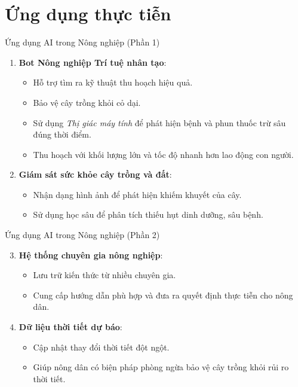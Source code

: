 \documentclass[aspectratio=169]{beamer}
\begin{document}
\section{Ứng dụng thực tiễn}
\begin{frame}{Ứng dụng AI trong Nông nghiệp (Phần 1)}
    \begin{enumerate}
        \item \textbf{Bot Nông nghiệp Trí tuệ nhân tạo}:
        \begin{itemize}
            \item Hỗ trợ tìm ra kỹ thuật thu hoạch hiệu quả.
            \item Bảo vệ cây trồng khỏi cỏ dại.
            \item Sử dụng \textit{Thị giác máy tính} để phát hiện bệnh và phun thuốc trừ sâu đúng thời điểm.
            \item Thu hoạch với khối lượng lớn và tốc độ nhanh hơn lao động con người.
        \end{itemize}
        \vspace{0.3cm}
        \item \textbf{Giám sát sức khỏe cây trồng và đất}:
        \begin{itemize}
            \item Nhận dạng hình ảnh để phát hiện khiếm khuyết của cây.
            \item Sử dụng học sâu để phân tích thiếu hụt dinh dưỡng, sâu bệnh.
        \end{itemize}
    \end{enumerate}
\end{frame}

\begin{frame}{Ứng dụng AI trong Nông nghiệp (Phần 2)}
    \begin{enumerate}
        \setcounter{enumi}{2}
        \item \textbf{Hệ thống chuyên gia nông nghiệp}:
        \begin{itemize}
            \item Lưu trữ kiến thức từ nhiều chuyên gia.
            \item Cung cấp hướng dẫn phù hợp và đưa ra quyết định thực tiễn cho nông dân.
        \end{itemize}
        \vspace{0.3cm}
        \item \textbf{Dữ liệu thời tiết dự báo}:
        \begin{itemize}
            \item Cập nhật thay đổi thời tiết đột ngột.
            \item Giúp nông dân có biện pháp phòng ngừa bảo vệ cây trồng khỏi rủi ro thời tiết.
        \end{itemize}
    \end{enumerate}
\end{frame}
\end{document}
